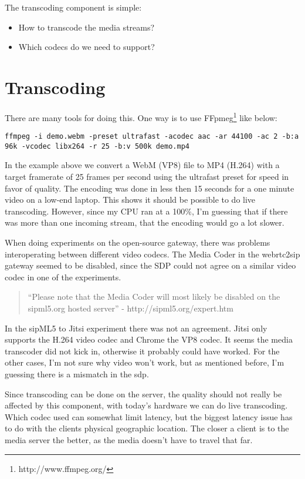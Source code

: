 The transcoding component is simple:

\begin{itemize}
\item{How to transcode the media streams?}
\item{Which codecs do we need to support?}
\end{itemize}

\section{Transcoding}
There are many tools for doing this. One way is to use FFpmeg\footnote{http://www.ffmpeg.org/} like below:

\begin{lstlisting}
ffmpeg -i demo.webm -preset ultrafast -acodec aac -ar 44100 -ac 2 -b:a 96k -vcodec libx264 -r 25 -b:v 500k demo.mp4
\end{lstlisting}

In the example above we convert a WebM (VP8) file to MP4 (H.264) with a target framerate of 25 frames per second using the ultrafast preset for speed in favor of quality. The encoding was done in less then 15 seconds for a one minute video on a low-end laptop. This shows it should be possible to do live transcoding. However, since my CPU ran at a 100\%, I'm guessing that if there was more than one incoming stream, that the encoding would go a lot slower.

When doing experiments on the open-source gateway, there was problems interoperating between different video codecs. The Media Coder in the webrtc2sip gateway seemed to be disabled, since the SDP could not agree on a similar video codec in one of the experiments.

\begin{quote}
``Please note that the Media Coder will most likely be disabled on the sipml5.org hosted server'' - http://sipml5.org/expert.htm
\end{quote}

In the sipML5 to Jitsi experiment there was not an agreement. Jitsi only supports the H.264 video codec and Chrome the VP8 codec. It seems the media transcoder did not kick in, otherwise it probably could have worked. For the other cases, I'm not sure why video won't work, but as mentioned before, I'm guessing there is a mismatch in the \gls{sdp}.

Since transcoding can be done on the server, the quality should not really be affected by this component, with today's hardware we can do live transcoding. Which codec used can somewhat limit latency, but the biggest latency issue has to do with the clients physical geographic location. The closer a client is to the media server the better, as the media doesn't have to travel that far.

